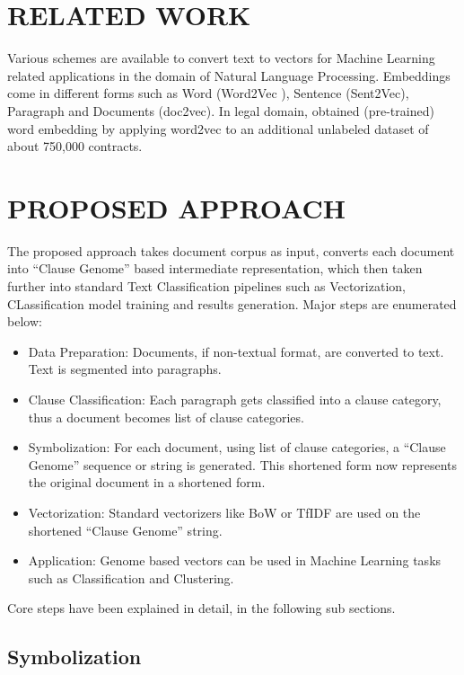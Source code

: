 \documentclass[9pt,academicons]{article}
\begin{document}
\section{RELATED WORK}
\label{sec:litsurvey}
Various schemes are available to convert text to vectors for Machine Learning related applications in the domain of Natural Language Processing. Embeddings come in different forms such as Word  (Word2Vec \cite{mikolov2013distributed}), Sentence (Sent2Vec), Paragraph and Documents (doc2vec). In legal domain, \cite{Chalkidis2017} obtained (pre-trained) word embedding by applying word2vec to an additional unlabeled dataset of about 750,000 contracts.

\section{PROPOSED APPROACH}
\label{sec:proposal}

The proposed approach takes document corpus as input, converts each document into ``Clause Genome'' based intermediate representation, which then taken further into standard Text Classification pipelines such as Vectorization, CLassification model training and results generation. Major steps are enumerated below:

 \begin{itemize}
 \item Data Preparation: Documents, if non-textual format, are converted to text. Text is segmented into paragraphs.
  \item Clause Classification: Each paragraph gets classified into a clause category, thus a document becomes list of clause categories.
\item Symbolization: For each document, using list of clause categories, a ``Clause Genome'' sequence or string is generated. This shortened form now represents the original document in a shortened form.
\item Vectorization: Standard vectorizers like BoW or TfIDF are used on the shortened ``Clause Genome'' string.
\item Application: Genome based vectors can be used in Machine Learning tasks such as Classification and Clustering.
 \end{itemize}

Core steps have been explained in detail, in the following sub sections.

\subsection{Symbolization}
\label{subsec:symbolization}
\end{document}
